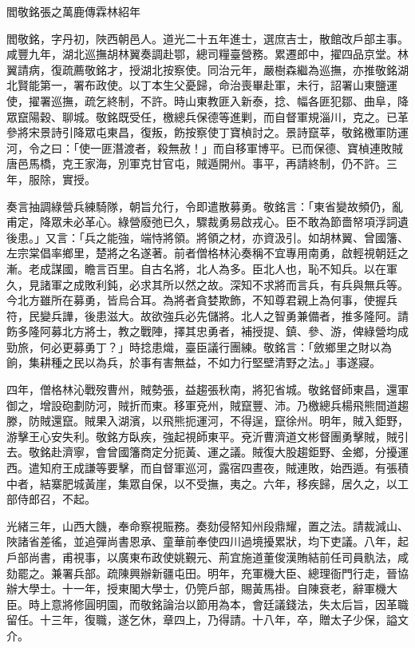 
\begin{pinyinscope}
閻敬銘張之萬鹿傳霖林紹年

閻敬銘，字丹初，陜西朝邑人。道光二十五年進士，選庶吉士，散館改戶部主事。咸豐九年，湖北巡撫胡林翼奏調赴鄂，總司糧臺營務。累遷郎中，擢四品京堂。林翼請病，復疏薦敬銘才，授湖北按察使。同治元年，嚴樹森繼為巡撫，亦推敬銘湖北賢能第一，署布政使。以丁本生父憂歸，命治喪畢赴軍，未行，詔署山東鹽運使，擢署巡撫，疏乞終制，不許。時山東教匪入新泰，捻、幅各匪犯鄒、曲阜，降眾竄陽穀、聊城。敬銘既受任，檄總兵保德等進剿，而自督軍規淄川，克之。已革參將宋景詩引降眾屯東昌，復叛，飭按察使丁寶楨討之。景詩竄莘，敬銘檄軍防運河，令之曰：「使一匪潛渡者，殺無赦！」而自移軍博平。已而保德、寶楨連敗賊唐邑馬橋，克王家海，別軍克甘官屯，賊遁開州。事平，再請終制，仍不許。三年，服除，實授。

奏言抽調綠營兵練騎隊，朝旨允行，令即遣散募勇。敬銘言：「東省變故頻仍，亂甫定，降眾未必革心。綠營廢弛已久，驟裁勇易啟戎心。臣不敢為節嗇帑項浮詞遺後患。」又言：「兵之能強，端恃將領。將領之材，亦資汲引。如胡林翼、曾國籓、左宗棠倡率鄉里，楚將之名遂著。前者僧格林沁奏稱不宜專用南勇，啟輕視朝廷之漸。老成謀國，瞻言百里。自古名將，北人為多。臣北人也，恥不知兵。以在軍久，見諸軍之成敗利鈍，必求其所以然之故。深知不求將而言兵，有兵與無兵等。今北方雖所在募勇，皆烏合耳。為將者貪婪欺飾，不知尊君親上為何事，使握兵符，民變兵譁，後患滋大。故欲強兵必先儲將。北人之智勇兼備者，推多隆阿。請飭多隆阿募北方將士，教之戰陣，擇其忠勇者，補授提、鎮、參、游，俾綠營均成勁旅，何必更募勇丁？」時捻患熾，臺臣議行團練。敬銘言：「斂鄉里之財以為餉，集耕種之民以為兵，於事有害無益，不如力行堅壁清野之法。」事遂寢。

四年，僧格林沁戰歿曹州，賊勢張，益趨張秋南，將犯省城。敬銘督師東昌，還軍御之，增設砲劃防河，賊折而東。移軍兗州，賊竄豐、沛。乃檄總兵楊飛熊間道趨滕，防賊還竄。賊果入湖濱，以飛熊扼運河，不得逞，竄徐州。明年，賊入鉅野，游擊王心安失利。敬銘方臥疾，強起視師東平。兗沂曹濟道文彬督團勇擊賊，賊引去。敬銘赴濟寧，會曾國籓商定分扼黃、運之議。賊復大股趨鉅野、金鄉，分擾運西。遣知府王成謙等要擊，而自督軍巡河，露宿四晝夜，賊連敗，始西遁。有張積中者，結寨肥城黃崖，集眾自保，以不受撫，夷之。六年，移疾歸，居久之，以工部侍郎召，不起。

光緒三年，山西大饑，奉命察視賑務。奏劾侵帑知州段鼎耀，置之法。請裁減山、陜諸省差徭，並追彈尚書恩承、童華前奉使四川過境擾累狀，均下吏議。八年，起戶部尚書，甫視事，以廣東布政使姚覲元、荊宜施道董俊漢賄結前任司員骫法，咸劾罷之。兼署兵部。疏陳興辦新疆屯田。明年，充軍機大臣、總理衙門行走，晉協辦大學士。十一年，授東閣大學士，仍筦戶部，賜黃馬褂。自陳衰老，辭軍機大臣。時上意將修圓明園，而敬銘論治以節用為本，會廷議錢法，失太后旨，因革職留任。十三年，復職，遂乞休，章四上，乃得請。十八年，卒，贈太子少保，謚文介。


\end{pinyinscope}
